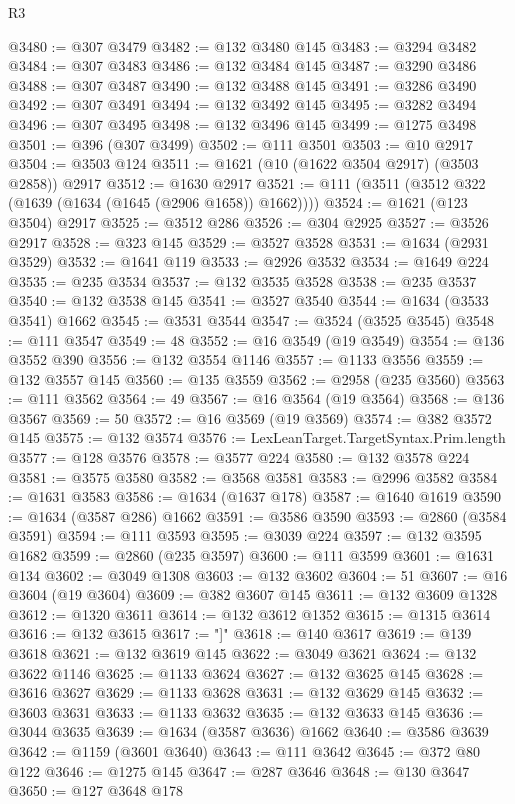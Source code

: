 \begin{lexlean}{R3}
\begin{coremodule}
@3480 := @307 @3479
@3482 := @132 @3480 @145
@3483 := @3294 @3482
@3484 := @307 @3483
@3486 := @132 @3484 @145
@3487 := @3290 @3486
@3488 := @307 @3487
@3490 := @132 @3488 @145
@3491 := @3286 @3490
@3492 := @307 @3491
@3494 := @132 @3492 @145
@3495 := @3282 @3494
@3496 := @307 @3495
@3498 := @132 @3496 @145
@3499 := @1275 @3498
@3501 := @396 (@307 @3499)
@3502 := @111 @3501
@3503 := @10 @2917
@3504 := @3503 @124
@3511 := @1621 (@10 (@1622 @3504 @2917) (@3503 @2858)) @2917
@3512 := @1630 @2917
@3521 := @111 (@3511 (@3512 @322 (@1639 (@1634 (@1645 (@2906 @1658)) @1662))))
@3524 := @1621 (@123 @3504) @2917
@3525 := @3512 @286
@3526 := @304 @2925
@3527 := @3526 @2917
@3528 := @323 @145
@3529 := @3527 @3528
@3531 := @1634 (@2931 @3529)
@3532 := @1641 @119
@3533 := @2926 @3532
@3534 := @1649 @224
@3535 := @235 @3534
@3537 := @132 @3535 @3528
@3538 := @235 @3537
@3540 := @132 @3538 @145
@3541 := @3527 @3540
@3544 := @1634 (@3533 @3541) @1662
@3545 := @3531 @3544
@3547 := @3524 (@3525 @3545)
@3548 := @111 @3547
@3549 := 48
@3552 := @16 @3549 (@19 @3549)
@3554 := @136 @3552 @390
@3556 := @132 @3554 @1146
@3557 := @1133 @3556
@3559 := @132 @3557 @145
@3560 := @135 @3559
@3562 := @2958 (@235 @3560)
@3563 := @111 @3562
@3564 := 49
@3567 := @16 @3564 (@19 @3564)
@3568 := @136 @3567
@3569 := 50
@3572 := @16 @3569 (@19 @3569)
@3574 := @382 @3572 @145
@3575 := @132 @3574
@3576 := LexLeanTarget.TargetSyntax.Prim.length
@3577 := @128 @3576
@3578 := @3577 @224
@3580 := @132 @3578 @224
@3581 := @3575 @3580
@3582 := @3568 @3581
@3583 := @2996 @3582
@3584 := @1631 @3583
@3586 := @1634 (@1637 @178)
@3587 := @1640 @1619
@3590 := @1634 (@3587 @286) @1662
@3591 := @3586 @3590
@3593 := @2860 (@3584 @3591)
@3594 := @111 @3593
@3595 := @3039 @224
@3597 := @132 @3595 @1682
@3599 := @2860 (@235 @3597)
@3600 := @111 @3599
@3601 := @1631 @134
@3602 := @3049 @1308
@3603 := @132 @3602
@3604 := 51
@3607 := @16 @3604 (@19 @3604)
@3609 := @382 @3607 @145
@3611 := @132 @3609 @1328
@3612 := @1320 @3611
@3614 := @132 @3612 @1352
@3615 := @1315 @3614
@3616 := @132 @3615
@3617 := "]"
@3618 := @140 @3617
@3619 := @139 @3618
@3621 := @132 @3619 @145
@3622 := @3049 @3621
@3624 := @132 @3622 @1146
@3625 := @1133 @3624
@3627 := @132 @3625 @145
@3628 := @3616 @3627
@3629 := @1133 @3628
@3631 := @132 @3629 @145
@3632 := @3603 @3631
@3633 := @1133 @3632
@3635 := @132 @3633 @145
@3636 := @3044 @3635
@3639 := @1634 (@3587 @3636) @1662
@3640 := @3586 @3639
@3642 := @1159 (@3601 @3640)
@3643 := @111 @3642
@3645 := @372 @80 @122
@3646 := @1275 @145
@3647 := @287 @3646
@3648 := @130 @3647
@3650 := @127 @3648 @178

\end{coremodule}
\end{lexlean}
